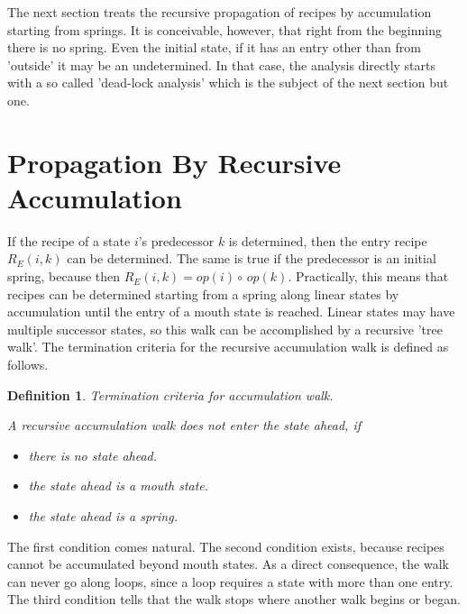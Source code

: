 \documentclass[12pt,a4paper]{scrartcl}
\newtheorem{definition}{Definition}
\begin{document}
The next section treats the recursive propagation of recipes by accumulation
starting from springs.  It is conceivable, however, that right from the
beginning there is no spring.  Even the initial state, if it has an entry other
than from 'outside' it may be an undetermined.  In that case, the analysis directly
starts with a so called 'dead-lock analysis' which is the subject of the next
section but one.

%
\section{Propagation By Recursive Accumulation}

If the recipe of a state $i$'s predecessor $k$ is determined, then the entry
recipe $R_E(i,k)$ can be determined. The same is true if the predecessor is an initial
spring, because then $R_E(i,k) = op(i)\circ\,op(k)$. Practically, this means
that recipes can be determined starting from a spring along linear states by
accumulation until the entry of a mouth state is reached. Linear states may
have multiple successor states, so this walk can be accomplished by a recursive
'tree walk'.  The termination criteria for the recursive accumulation walk is
defined as follows.

\begin{definition}
Termination criteria for accumulation walk.

A recursive accumulation walk does not enter the state ahead, if 

\begin{itemize}
    \item there is no state ahead.
    \item the state ahead is a mouth state.
    \item the state ahead is a spring.
\end{itemize}
\end{definition}

The first condition comes natural. The second condition exists, because recipes
cannot be accumulated beyond mouth states. As a direct consequence, the walk
can never go along loops, since a loop requires a state with more than one
entry. The third condition tells that the walk stops where another walk begins
or began.  
\end{document}
